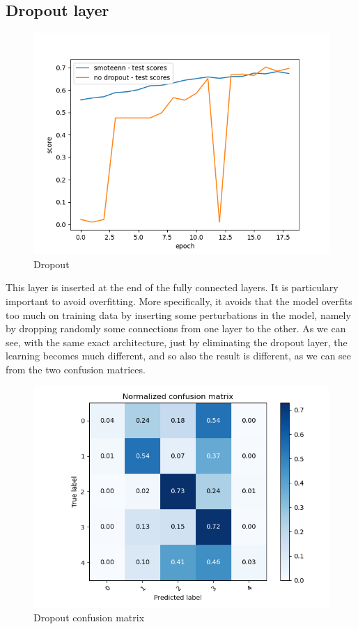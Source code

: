 \documentclass[12pt,a4paper,oneside]{article}
\begin{document}
\subsection{Dropout layer}

\begin{figure}[H]
    \includegraphics{figures/dropout.png}
    \caption{Dropout}
\end{figure}

This layer is inserted at the end of the fully connected layers. It is
particulary important to avoid overfitting. More specifically, it avoids that
the model overfits too much on training data by inserting some perturbations in
the model, namely by dropping randomly some connections from one layer to the
other. As we can see, with the same exact architecture, just by eliminating the
dropout layer, the learning becomes much different, and so also the result is
different, as we can see from the two confusion matrices.

\begin{figure}[H]
    \includegraphics{figures/dropout_confusion.png}
    \caption{Dropout confusion matrix}
\end{figure}
\end{document}
